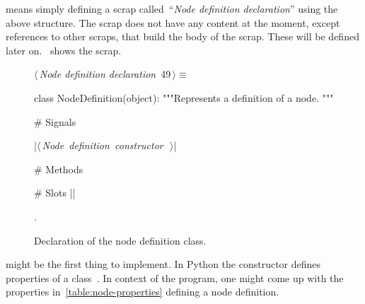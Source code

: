 \documentclass[%
    a4paper,    %
    justified,  %
    nobib,      %
    openany     %
]{tufte-book}
\makeatletter
\renewcommand{\label}[1]{\@tufte@label{##1}}%
\makeatother
\begin{document}
\newpage{}

 means simply
defining a scrap called~\enquote{\emph{Node definition declaration}}
using the above structure. The scrap does not have any content at the
moment, except references to other scraps, that build the body of the scrap.
These will be defined later on.~ shows the
scrap.

\begin{figure}[h]
  \begin{flushleft} \small
\begin{minipage}{\linewidth}\label{scrap1}\raggedright\small
{} $\langle\,${\itshape Node definition declaration}\nobreak\ {\footnotesize {49}}$\,\rangle\equiv$
\vspace{-1ex}
\begin{pythoncode}
class NodeDefinition(object):
    """Represents a definition of a node.
    """

    # Signals

    |\hbox{$\langle\,${\itshape Node definition constructor}\nobreak\ {\footnotesize {}}$\,\rangle$}|

    # Methods

    # Slots
|\NWsep|
\end{pythoncode}
\vspace{1.5ex}
\footnotesize
\begin{list}{}{\setlength{\itemsep}{-\parsep}\setlength{\itemindent}{-\leftmargin}}
\item {\NWtxtMacroNoRef}.

\item{}
\end{list}
\end{minipage}\vspace{4ex}
\end{flushleft}
\caption{Declaration of the node definition class.}
\end{figure}

 might be the first thing to implement. In Python
the constructor defines properties of a class~. In
context of the program, one might come up with the properties
in~\autoref{table:node-properties} defining a node definition.
\end{document}
